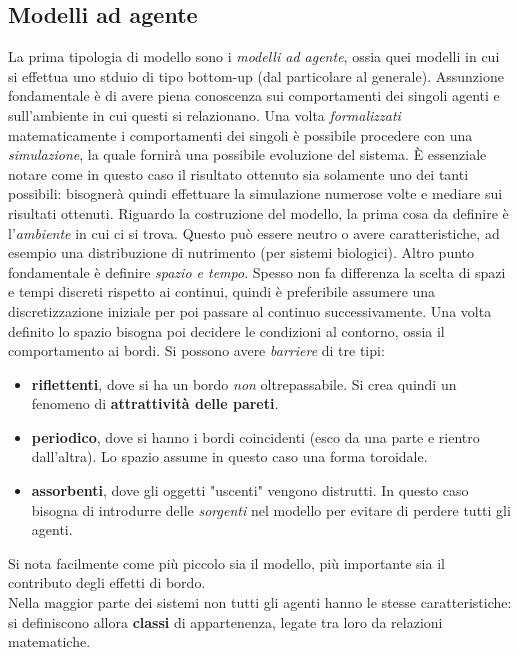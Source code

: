 \documentclass[12pt, a4paper]{book}
\theoremstyle{theorem}
\begin{document}
			\subsection{Modelli ad agente}
				La prima tipologia di modello sono i \emph{modelli ad agente}, ossia quei modelli in cui si effettua uno stduio di tipo bottom-up (dal particolare al generale).
				Assunzione fondamentale è di avere piena conoscenza sui comportamenti dei singoli agenti e sull'ambiente in cui questi si relazionano.
				Una volta \emph{formalizzati} matematicamente i comportamenti dei singoli è possibile procedere con una \emph{simulazione}, la quale fornirà una possibile evoluzione del sistema.
				È essenziale notare come in questo caso il risultato ottenuto sia solamente uno dei tanti possibili: bisognerà quindi effettuare la simulazione numerose volte e mediare sui risultati ottenuti.
				Riguardo la costruzione del modello, la prima cosa da definire è l'\textit{ambiente} in cui ci si trova. 
				Questo può essere neutro o avere caratteristiche, ad esempio una distribuzione di nutrimento (per sistemi biologici).
				Altro punto fondamentale è definire \textit{spazio e tempo}. 
				Spesso non fa differenza la scelta di spazi e tempi discreti rispetto ai continui, quindi è preferibile assumere una discretizzazione iniziale per poi passare al continuo successivamente.
				Una volta definito lo spazio bisogna poi decidere le condizioni al contorno, ossia il comportamento ai bordi. 
				Si possono avere \textit{barriere} di tre tipi:
				\begin{itemize}
					\item \textbf{riflettenti}, dove si ha un bordo \textit{non} oltrepassabile. Si crea quindi un fenomeno di \textbf{attrattività delle pareti}.
					\item \textbf{periodico}, dove si hanno i bordi coincidenti (esco da una parte e rientro dall'altra). Lo spazio assume in questo caso una forma toroidale.
					\item \textbf{assorbenti}, dove gli oggetti "uscenti" vengono distrutti. In questo caso bisogna di introdurre delle \textit{sorgenti} nel modello per evitare di perdere tutti gli agenti.
				\end{itemize}
				Si nota facilmente come più piccolo sia il modello, più importante sia il contributo degli effetti di bordo.\\
				Nella maggior parte dei sistemi non tutti gli agenti hanno le stesse caratteristiche: si definiscono allora \textbf{classi} di appartenenza, legate tra loro da relazioni matematiche.
\end{document}
